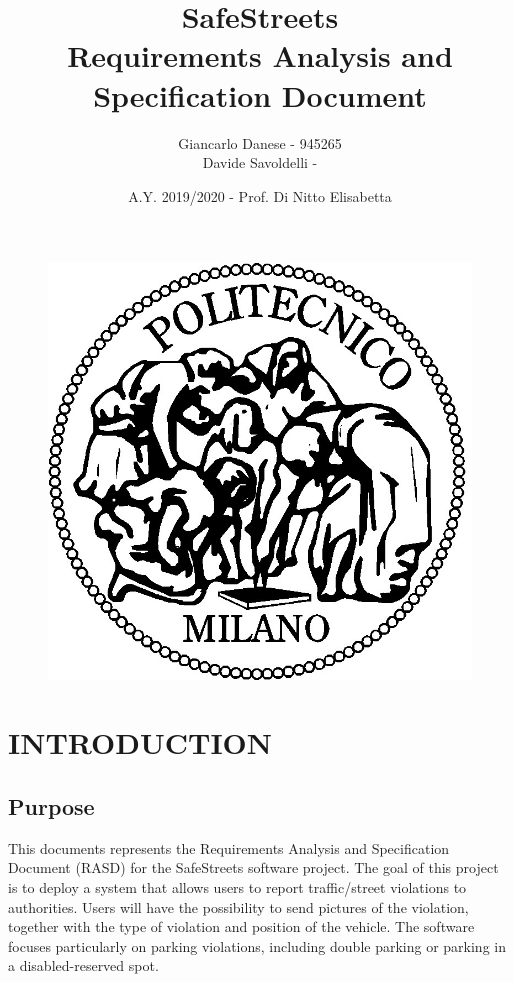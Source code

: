 \documentclass[12pt,a4paper]{article}
\author{Giancarlo Danese - 945265 \\
Davide Savoldelli - }
\date{A.Y. 2019/2020 - Prof. Di Nitto Elisabetta}
\title{
 \textbf{\Huge{SafeStreets}} \\
 \large Requirements Analysis and Specification Document
}
\begin{document}
 \begin{figure}
  \centering
  \includegraphics[width=1.0\linewidth]{assets/images/logo_poli.jpg}
 \end{figure}

 \maketitle
 \newpage
 \tableofcontents
 \newpage

\section{INTRODUCTION}
\subsection{Purpose} 
This documents represents the Requirements Analysis and Specification Document (RASD) for the SafeStreets software project.
The goal of this project is to deploy a system that allows users to report traffic/street violations to authorities. \newline
Users will have the possibility to send pictures of the violation, together with the type of violation and position of the vehicle. The software focuses particularly on parking violations, including double parking or parking in a disabled-reserved spot.
\end{document}
